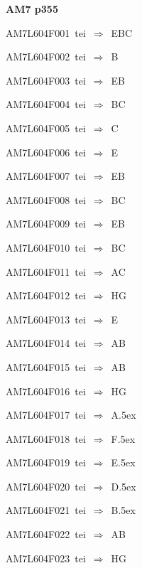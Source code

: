 \par\vfill\eject
{\bf\hfill AM7 p355\hfill\hbox{}}\par\bigskip
{\sixrm AM7L604F001\ {\sixit tei}\ }$\Rightarrow$\ EBC\par\smallskip
{\sixrm AM7L604F002\ {\sixit tei}\ }$\Rightarrow$\ B\par\smallskip
{\sixrm AM7L604F003\ {\sixit tei}\ }$\Rightarrow$\ EB\par\smallskip
{\sixrm AM7L604F004\ {\sixit tei}\ }$\Rightarrow$\ BC\par\smallskip
{\sixrm AM7L604F005\ {\sixit tei}\ }$\Rightarrow$\ C\par\smallskip
{\sixrm AM7L604F006\ {\sixit tei}\ }$\Rightarrow$\ E\par\smallskip
{\sixrm AM7L604F007\ {\sixit tei}\ }$\Rightarrow$\ EB\par\smallskip
{\sixrm AM7L604F008\ {\sixit tei}\ }$\Rightarrow$\ BC\par\smallskip
{\sixrm AM7L604F009\ {\sixit tei}\ }$\Rightarrow$\ EB\par\smallskip
{\sixrm AM7L604F010\ {\sixit tei}\ }$\Rightarrow$\ BC\par\smallskip
{\sixrm AM7L604F011\ {\sixit tei}\ }$\Rightarrow$\ AC\par\smallskip
{\sixrm AM7L604F012\ {\sixit tei}\ }$\Rightarrow$\ HG\par\smallskip
{\sixrm AM7L604F013\ {\sixit tei}\ }$\Rightarrow$\ E\par\smallskip
{\sixrm AM7L604F014\ {\sixit tei}\ }$\Rightarrow$\ AB\par\smallskip
{\sixrm AM7L604F015\ {\sixit tei}\ }$\Rightarrow$\ AB\par\smallskip
{\sixrm AM7L604F016\ {\sixit tei}\ }$\Rightarrow$\ HG\par\smallskip
{\sixrm AM7L604F017\ {\sixit tei}\ }$\Rightarrow$\ A\lower.5ex\hbox{}\par\smallskip
{\sixrm AM7L604F018\ {\sixit tei}\ }$\Rightarrow$\ F\lower.5ex\hbox{}\par\smallskip
{\sixrm AM7L604F019\ {\sixit tei}\ }$\Rightarrow$\ E\lower.5ex\hbox{}\par\smallskip
{\sixrm AM7L604F020\ {\sixit tei}\ }$\Rightarrow$\ D\lower.5ex\hbox{}\par\smallskip
{\sixrm AM7L604F021\ {\sixit tei}\ }$\Rightarrow$\ B\lower.5ex\hbox{}\par\smallskip
{\sixrm AM7L604F022\ {\sixit tei}\ }$\Rightarrow$\ AB\par\smallskip
{\sixrm AM7L604F023\ {\sixit tei}\ }$\Rightarrow$\ HG\par\smallskip

